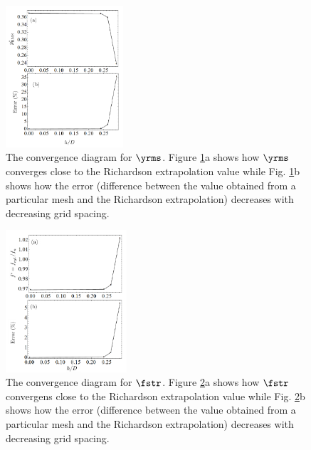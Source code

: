 \documentclass[a4paper,fleqn]{cas-sc}
\begin{document}
\begin{figure}
  \centering
  \includegraphics[width=0.39\textwidth]{figs/figure7}
  \caption{The convergence diagram for $\yrms$. Figure \ref{fig:yrmsGCI}a shows how $\yrms$ converges close to the Richardson extrapolation value while Fig. \ref{fig:yrmsGCI}b shows how the error (difference between the value obtained from a particular mesh and the Richardson extrapolation) decreases with decreasing grid spacing.} \label{fig:yrmsGCI}
\end{figure}

\begin{figure}
  \centering
  \includegraphics[width=0.4\textwidth]{figs/figure8}
  \caption{The convergence diagram for $\fstr$. Figure \ref{fig:fstrGCI}a shows how $\fstr$ convergens close to the Richardson extrapolation value while Fig. \ref{fig:fstrGCI}b shows how the error (difference between the value obtained from a particular mesh and the Richardson extrapolation) decreases with decreasing grid spacing.} \label{fig:fstrGCI}
\end{figure}
\end{document}
